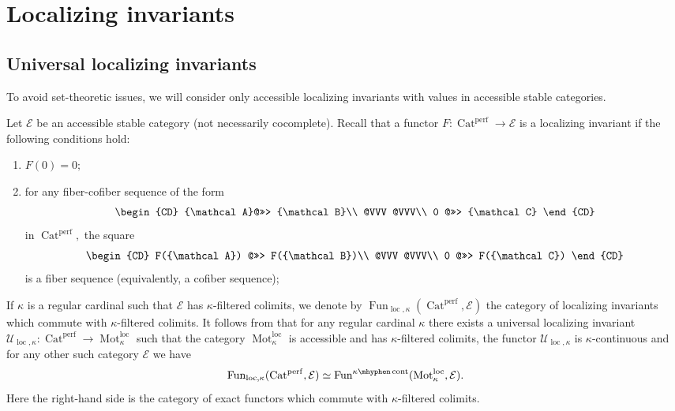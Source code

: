 \documentclass[11pt,leqno]{amsart}
\numberwithin{equation}{section}
\newcommand{\hy}{\mhyphen}
\newcommand{\Mot}{\operatorname{Mot}}
\newcommand{\Cat}{\operatorname{Cat}}
\newcommand{\loc}{\operatorname{loc}}
\newcommand{\cont}{\operatorname{cont}}
\newcommand{\cA}{{\mathcal A}}
\newcommand{\cB}{{\mathcal B}}
\newcommand{\cC}{{\mathcal C}}
\newcommand{\cE}{{\mathcal E}}
\newcommand{\cU}{{\mathcal U}}
\newcommand{\Fun}{\operatorname{Fun}}
\newcommand{\perf}{\operatorname{perf}}
\begin{document}
\section{Localizing invariants}
\label{sec:localizing_invariants}

\subsection{Universal localizing invariants}
\label{ssec:U_loc}

To avoid set-theoretic issues, we will consider only accessible localizing invariants with values in accessible stable categories.

Let $\cE$ be an accessible stable category (not necessarily cocomplete). Recall that a functor $F:\Cat^{\perf}\to\cE$ is a localizing invariant if the following conditions hold:

\begin{enumerate}[label=(\roman*),ref=(\roman*)]
\item $F(0)=0;$ \label{kappa_loc1}

\item for any fiber-cofiber sequence of the form
$$
\begin{CD}
\cA @>>> \cB\\
@VVV @VVV\\
0 @>>> \cC
\end{CD}
$$ 
in $\Cat^{\perf},$ the square
$$
\begin{CD}
F(\cA) @>>> F(\cB)\\
@VVV @VVV\\
0 @>>> F(\cC)
\end{CD}
$$
is a fiber sequence (equivalently, a cofiber sequence); \label{kappa_loc2}
\end{enumerate}

If $\kappa$ is a regular cardinal such that $\cE$ has $\kappa$-filtered colimits, we denote by $\Fun_{\loc,\kappa}(\Cat^{\perf},\cE)$ the category of localizing invariants which commute with $\kappa$-filtered colimits. It follows from \cite{BGT} that for any regular cardinal $\kappa$ there exists a universal localizing invariant
$\cU_{\loc,\kappa}:\Cat^{\perf}\to\Mot^{\loc}_{\kappa}$
such that the category $\Mot^{\loc}_{\kappa}$ is accessible and has $\kappa$-filtered colimits, the functor $\cU_{\loc,\kappa}$ is $\kappa$-continuous and for any other such category $\cE$ we have
$$\Fun_{\loc,\kappa}(\Cat^{\perf},\cE)\simeq \Fun^{\kappa\hy\cont}(\Mot^{\loc}_{\kappa},\cE).$$
Here the right-hand side is the category of exact functors which commute with $\kappa$-filtered colimits.
\end{document}
